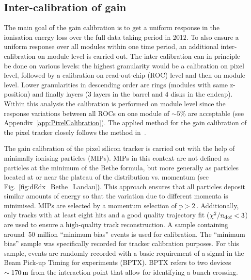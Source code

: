 \subsection*{Inter-calibration of gain}
The main goal of the gain calibration is to get a uniform response in the ionisation energy loss \dedx over the full data taking period in 2012.
To also ensure a uniform response over all modules within one time period, an additional inter-calibration on module level is carried out.
The inter-calibration can in principle be done on various levels: the highest granularity would be a calibration on pixel level, followed by a calibration on read-out-chip (ROC) level and then on module level.
Lower granularities in descending order are rings (modules with same z-position) and finally layers (3 layers in the barrel and 4 disks in the endcap). 
Within this analysis the calibration is performed on module level since the response variations between all ROCs on one module of $\sim5\%$ are acceptable (see Appendix~\ref{app:PixelCalibration}). 
The applied method for the gain calibration of the pixel tracker closely follows the method in~\cite{bib:Quertenmont_2010}.

The gain calibration of the pixel silicon tracker is carried out with the help of minimally ionising particles (MIPs).
MIPs in this context are not defined as particles at the minimum of the Bethe formula, but more generally as particles located at or near the plateau of the \dedx distribution vs. momentum (see Fig.~\ref{fig:dEdx_Bethe_Landau}).
This approach ensures that all particles deposit similar amounts of energy so that the variation due to different momenta is minimised.
MIPs are selected by a momentum selection of $\text{p}>2\,$\gev.
Additionally, only tracks with at least eight hits and a good quality trajectory fit ($\chi^2/n_{\text{dof}}<3$) are used to ensure a high-quality track reconstruction.
A sample containing around $~$50 million ``minimum bias'' events is used for calibration.
The ``minimum bias'' sample was specifically recorded for tracker calibration purposes.
For this sample, events are randomly recorded with a basic requirement of a signal in the Beam Pick-up Timing for experiments (BPTX).
BPTX refers to two devices $\sim 170\,\text{m}$ from the interaction point that allow for identifying a bunch crossing.

